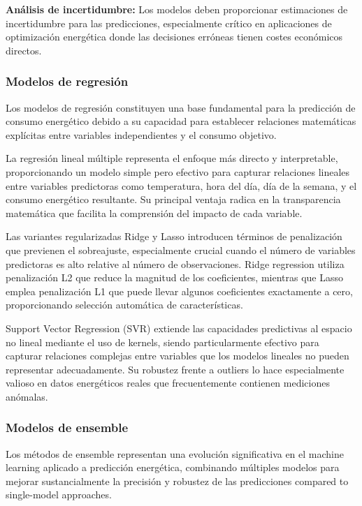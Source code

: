 \textbf{Análisis de incertidumbre:} Los modelos deben proporcionar estimaciones de incertidumbre para las predicciones, especialmente crítico en aplicaciones de optimización energética donde las decisiones erróneas tienen costes económicos directos.

\subsubsection{Modelos de regresión}

Los modelos de regresión constituyen una base fundamental para la predicción de consumo energético debido a su capacidad para establecer relaciones matemáticas explícitas entre variables independientes y el consumo objetivo.

La regresión lineal múltiple representa el enfoque más directo y interpretable, proporcionando un modelo simple pero efectivo para capturar relaciones lineales entre variables predictoras como temperatura, hora del día, día de la semana, y el consumo energético resultante. Su principal ventaja radica en la transparencia matemática que facilita la comprensión del impacto de cada variable.

Las variantes regularizadas Ridge y Lasso introducen términos de penalización que previenen el sobreajuste, especialmente crucial cuando el número de variables predictoras es alto relative al número de observaciones. Ridge regression utiliza penalización L2 que reduce la magnitud de los coeficientes, mientras que Lasso emplea penalización L1 que puede llevar algunos coeficientes exactamente a cero, proporcionando selección automática de características.

Support Vector Regression (SVR) extiende las capacidades predictivas al espacio no lineal mediante el uso de kernels, siendo particularmente efectivo para capturar relaciones complejas entre variables que los modelos lineales no pueden representar adecuadamente. Su robustez frente a outliers lo hace especialmente valioso en datos energéticos reales que frecuentemente contienen mediciones anómalas.

\subsubsection{Modelos de ensemble}

Los métodos de ensemble representan una evolución significativa en el machine learning aplicado a predicción energética, combinando múltiples modelos para mejorar sustancialmente la precisión y robustez de las predicciones compared to single-model approaches.

